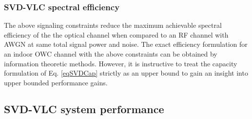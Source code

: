 \subsubsection{SVD-VLC spectral efficiency}
\label{subsubsec:svdvlcSpectralEfficiency}
The above signaling constraints reduce the maximum achievable spectral efficiency of the the optical channel when compared to an RF channel with AWGN at same total signal power and noise. The exact efficiency formulation for an indoor OWC channel with the above constraints can be obtained by information theoretic methods. However, it is instructive to treat the capacity formulation of Eq. \eqref{eqSVDCap} strictly as an upper bound to gain an insight into upper bounded performance gains.

\subsection{SVD-VLC system performance}
\label{sec:analysis}

